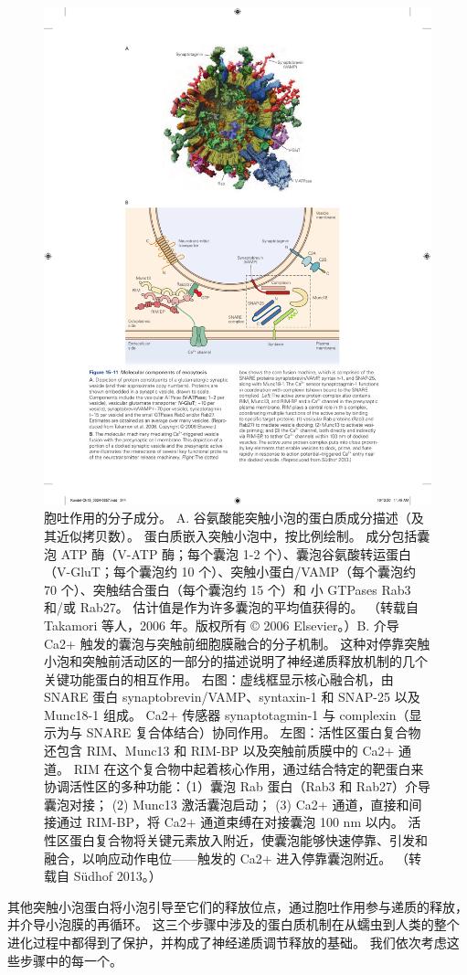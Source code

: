 \begin{figure}[htbp]
	\centering
	\includegraphics[width=0.7\linewidth]{chap15/fig_15_11}
	\caption{胞吐作用的分子成分。 A. 谷氨酸能突触小泡的蛋白质成分描述（及其近似拷贝数）。 蛋白质嵌入突触小泡中，按比例绘制。 成分包括囊泡 ATP 酶（V-ATP 酶；每个囊泡 1-2 个）、囊泡谷氨酸转运蛋白（V-GluT；每个囊泡约 10 个）、突触小蛋白/VAMP（每个囊泡约 70 个）、突触结合蛋白（每个囊泡约 15 个）和 小 GTPases Rab3 和/或 Rab27。 估计值是作为许多囊泡的平均值获得的。 （转载自 Takamori 等人，2006 年。版权所有 © 2006 Elsevier。）B. 介导 Ca2+ 触发的囊泡与突触前细胞膜融合的分子机制。 这种对停靠突触小泡和突触前活动区的一部分的描述说明了神经递质释放机制的几个关键功能蛋白的相互作用。 右图：虚线框显示核心融合机，由 SNARE 蛋白 synaptobrevin/VAMP、syntaxin-1 和 SNAP-25 以及 Munc18-1 组成。 Ca2+ 传感器 synaptotagmin-1 与 complexin（显示为与 SNARE 复合体结合）协同作用。 左图：活性区蛋白复合物还包含 RIM、Munc13 和 RIM-BP 以及突触前质膜中的 Ca2+ 通道。 RIM 在这个复合物中起着核心作用，通过结合特定的靶蛋白来协调活性区的多种功能：（1）囊泡 Rab 蛋白（Rab3 和 Rab27）介导囊泡对接； (2) Munc13 激活囊泡启动； (3) Ca2+ 通道，直接和间接通过 RIM-BP，将 Ca2+ 通道束缚在对接囊泡 100 nm 以内。 活性区蛋白复合物将关键元素放入附近，使囊泡能够快速停靠、引发和融合，以响应动作电位——触发的 Ca2+ 进入停靠囊泡附近。 （转载自 Südhof 2013。）}
	\label{fig:15_11}
\end{figure}


其他突触小泡蛋白将小泡引导至它们的释放位点，通过胞吐作用参与递质的释放，并介导小泡膜的再循环。
这三个步骤中涉及的蛋白质机制在从蠕虫到人类的整个进化过程中都得到了保护，并构成了神经递质调节释放的基础。
我们依次考虑这些步骤中的每一个。



